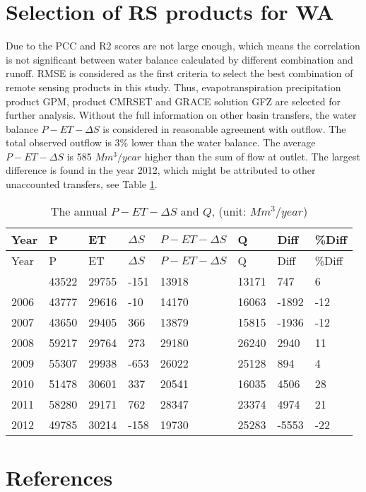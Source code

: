\documentclass{article}%
\begin{document}
\section{Selection of RS products for WA}%
\label{sec:SelectionofRSproductsforWA}%
Due to the PCC and R2 scores are not large enough, which means the correlation is not significant between water balance calculated by different combination and runoff. RMSE is considered as the first criteria to select the best combination of remote sensing products in this study.%
\linebreak%
Thus, evapotranspiration precipitation product GPM, product CMRSET and GRACE solution GFZ are selected for further analysis.%
\linebreak%
Without the full information on other basin transfers, the water balance $P-ET-\Delta S$ is considered in reasonable agreement with outflow. The total observed outflow is 3\% lower than the water balance. The average $P-ET-\Delta S$ is 585 $Mm^3/year$ higher than the sum of flow at outlet. The largest difference is found in the year 2012, which might be attributed to other unaccounted transfers, see Table \ref{table:tab2}.%
\linebreak%
\begin{longtable}{|l|l|l|l|l|l|l|l|}%
\caption{The annual $P-ET-\Delta S$ and $Q$, (unit: $Mm^3/year$)}%
\label{table:tab2}\\%
\hline%
\textbf{Year}&\textbf{P}&\textbf{ET}&\textbf{$\Delta S$}&\textbf{$P-ET-\Delta S$}&\textbf{Q}&\textbf{Diff}&\textbf{\%Diff}\\%
\hline%
\endfirsthead%
\hline%
Year&P&ET&$\Delta S$&$P-ET-\Delta S$&Q&Diff&\%Diff\\%
\hline%
\endhead%
\hline%
\endfoot%
2005&43522&29755&{-}151&13918&13171&747&6\\%
2006&43777&29616&{-}10&14170&16063&{-}1892&{-}12\\%
2007&43650&29405&366&13879&15815&{-}1936&{-}12\\%
2008&59217&29764&273&29180&26240&2940&11\\%
2009&55307&29938&{-}653&26022&25128&894&4\\%
2010&51478&30601&337&20541&16035&4506&28\\%
2011&58280&29171&762&28347&23374&4974&21\\%
2012&49785&30214&{-}158&19730&25283&{-}5553&{-}22\\%
\end{longtable}

%
\newpage%
\section*{References}%
\label{sec:References}%
%
\printbibliography[heading=none]
\end{document}
